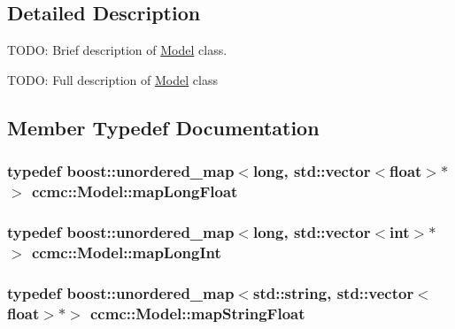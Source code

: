 \subsection{Detailed Description}
T\-O\-D\-O\-: Brief description of \hyperlink{classccmc_1_1_model}{Model} class. 

T\-O\-D\-O\-: Full description of \hyperlink{classccmc_1_1_model}{Model} class 

\subsection{Member Typedef Documentation}
\hypertarget{classccmc_1_1_model_ad5da02fd8e4dcfbd4c0425ae6cfdc829}{
\subsubsection[{map\-Long\-Float}]{\setlength{\rightskip}{0pt plus 5cm}typedef boost\-::unordered\-\_\-map$<$long, std\-::vector$<$float$>$$\ast$$>$ {\bf ccmc\-::\-Model\-::map\-Long\-Float}\hspace{0.3cm}{\ttfamily [protected]}}}\label{classccmc_1_1_model_ad5da02fd8e4dcfbd4c0425ae6cfdc829}
\hypertarget{classccmc_1_1_model_aacb96d67a660454a3287439db8b474a7}{
\subsubsection[{map\-Long\-Int}]{\setlength{\rightskip}{0pt plus 5cm}typedef boost\-::unordered\-\_\-map$<$long, std\-::vector$<$int$>$$\ast$$>$ {\bf ccmc\-::\-Model\-::map\-Long\-Int}\hspace{0.3cm}{\ttfamily [protected]}}}\label{classccmc_1_1_model_aacb96d67a660454a3287439db8b474a7}
\hypertarget{classccmc_1_1_model_a0569e60cc0eab011a5ec40f927e1c307}{
\subsubsection[{map\-String\-Float}]{\setlength{\rightskip}{0pt plus 5cm}typedef boost\-::unordered\-\_\-map$<$std\-::string, std\-::vector$<$float$>$$\ast$$>$ {\bf ccmc\-::\-Model\-::map\-String\-Float}\hspace{0.3cm}{\ttfamily [protected]}}}\label{classccmc_1_1_model_a0569e60cc0eab011a5ec40f927e1c307}
